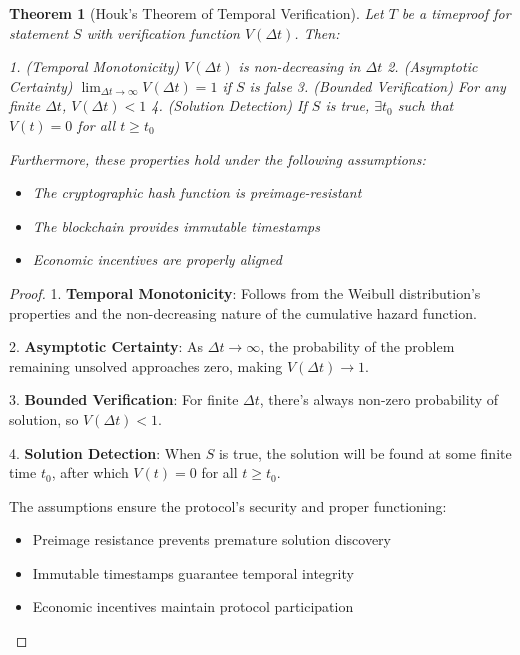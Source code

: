 \documentclass[12pt]{report}
\newtheorem{theorem}{Theorem}
\begin{document}
\begin{theorem}[Houk's Theorem of Temporal Verification]
Let \( T \) be a timeproof for statement \( S \) with verification function \( V(\Delta t) \). Then:

1. (Temporal Monotonicity) \( V(\Delta t) \) is non-decreasing in \( \Delta t \)
2. (Asymptotic Certainty) \( \lim_{\Delta t \to \infty} V(\Delta t) = 1 \) if \( S \) is false
3. (Bounded Verification) For any finite \( \Delta t \), \( V(\Delta t) < 1 \)
4. (Solution Detection) If \( S \) is true, \( \exists t_0 \) such that \( V(t) = 0 \) for all \( t \geq t_0 \)

Furthermore, these properties hold under the following assumptions:
\begin{itemize}
    \item The cryptographic hash function is preimage-resistant
    \item The blockchain provides immutable timestamps
    \item Economic incentives are properly aligned
\end{itemize}
\end{theorem}

\begin{proof}
1. \textbf{Temporal Monotonicity}: Follows from the Weibull distribution's properties and the non-decreasing nature of the cumulative hazard function.

2. \textbf{Asymptotic Certainty}: As \( \Delta t \to \infty \), the probability of the problem remaining unsolved approaches zero, making \( V(\Delta t) \to 1 \).

3. \textbf{Bounded Verification}: For finite \( \Delta t \), there's always non-zero probability of solution, so \( V(\Delta t) < 1 \).

4. \textbf{Solution Detection}: When \( S \) is true, the solution will be found at some finite time \( t_0 \), after which \( V(t) = 0 \) for all \( t \geq t_0 \).

The assumptions ensure the protocol's security and proper functioning:
\begin{itemize}
    \item Preimage resistance prevents premature solution discovery
    \item Immutable timestamps guarantee temporal integrity
    \item Economic incentives maintain protocol participation
\end{itemize}
\end{proof}
\end{document}
